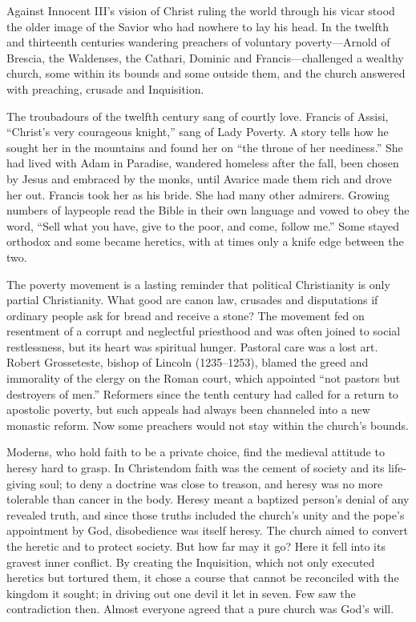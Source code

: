 
\begin{inbrief}
Against Innocent III's vision of Christ ruling the world through his vicar stood the older image of
the Savior who had nowhere to lay his head. In the twelfth and thirteenth centuries wandering
preachers of voluntary poverty---Arnold of Brescia, the Waldenses, the Cathari, Dominic and
Francis---challenged a wealthy church, some within its bounds and some outside them, and the church
answered
with preaching, crusade and Inquisition.
\end{inbrief}

The troubadours of the twelfth century sang of courtly love. Francis of Assisi, ``Christ's very
courageous knight,'' sang of Lady Poverty. A story tells how he sought her in the mountains and found
her on ``the throne of her neediness.'' She had lived with Adam in Paradise, wandered homeless after
the fall, been chosen by Jesus and embraced by the monks, until Avarice made them rich and drove her
out. Francis took her as his bride. She had many other admirers. Growing numbers of laypeople read the
Bible in their own language and vowed to obey the word, ``Sell what you have, give to the poor, and
come, follow me.'' Some stayed orthodox and some became heretics, with at times only a knife edge
between the two.

The poverty movement is a lasting reminder that political Christianity is only partial Christianity.
What good are canon law, crusades and disputations if ordinary people ask for bread and receive a
stone? The movement fed on resentment of a corrupt and neglectful priesthood and was often joined to
social restlessness, but its heart was spiritual hunger. Pastoral care was a lost art. Robert
Grosseteste, bishop of Lincoln (1235--1253), blamed the greed and immorality of the clergy on the
Roman court, which appointed ``not pastors but destroyers of men.'' Reformers since the tenth century
had called for a return to apostolic poverty, but such appeals had always been channeled into a new
monastic reform. Now some preachers would not stay within the church's bounds.

Moderns, who hold faith to be a private choice, find the medieval attitude to heresy hard to grasp.
In Christendom faith was the cement of society and its life-giving soul; to deny a doctrine was close
to treason, and heresy was no more tolerable than cancer in the body. Heresy meant a baptized
person's denial of any revealed truth, and since those truths included the church's unity and the pope's appointment by God, disobedience was itself heresy. The church aimed to convert the
heretic and to protect society. But how far may it go? Here it fell into its gravest inner conflict.
By creating the Inquisition, which not only executed heretics but tortured them, it chose a course
that cannot be reconciled with the kingdom it sought; in driving out one devil it let in seven. Few
saw the contradiction then. Almost everyone agreed that a pure church was God's will.

